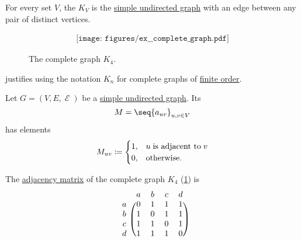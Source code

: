 \begin{example}\label{ex:complete_graph}
  For every set \( V \), the  \( K_V \) is the \hyperref[def:undirected_multigraph]{simple undirected graph} with an edge between any pair of distinct vertices.

  \begin{figure}
    \begin{equation}\label{eq:fig:ex:complete_graph}
      \begin{aligned}
        \texttt{[image: figures/ex\_\_complete\_graph.pdf]}
      \end{aligned}
    \end{equation}
    \caption{The complete graph \( K_4 \).}\label{fig:ex:complete_graph}
  \end{figure}

   justifies using the notation \( K_n \) for complete graphs of \hyperref[def:hypergraph/order]{finite order}.
\end{example}

\begin{definition}\label{def:graph_adjacency_matrix}
  Let \( G = (V, E, \mscrE) \) be a \hyperref[def:undirected_multigraph]{simple undirected graph}. Its 
  \begin{equation*}
    M = \seq{ a_{uv} }_{u, v \in V}
  \end{equation*}
  has elements
  \begin{equation*}
    M_{uv} \coloneqq \begin{cases}
      1, &u \T{is adjacent to} v \\
      0, &\T{otherwise.}
    \end{cases}
  \end{equation*}
\end{definition}

\begin{example}\label{ex:def:graph_adjacency_matrix}
  The \hyperref[def:graph_adjacency_matrix]{adjacency matrix} of the complete graph \( K_4 \) (\cref{fig:ex:complete_graph}) is
  \begin{equation}\label{eq:ex:def:graph_adjacency_matrix}
    \begin{blockarray}{ccccc}
        & a & b & c & d \\
    \begin{block}{c(cccc)}
      a & 0 & 1 & 1 & 1 \\
      b & 1 & 0 & 1 & 1 \\
      c & 1 & 1 & 0 & 1 \\
      d & 1 & 1 & 1 & 0 \\
    \end{block}
    \end{blockarray}
  \end{equation}
\end{example}


